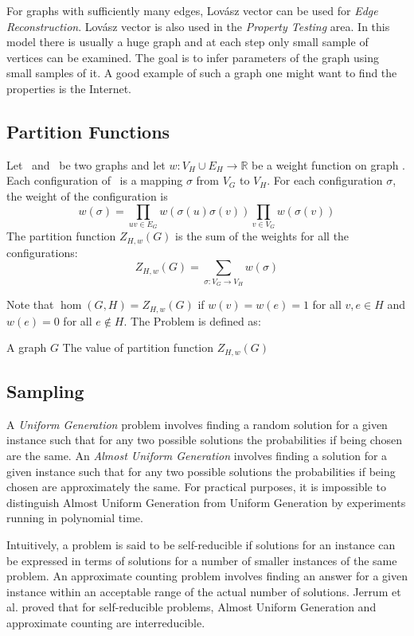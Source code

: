 For graphs with sufficiently many edges,
Lov\'{a}sz vector can be used for \emph{Edge Reconstruction}.
Lov\'{a}sz vector is also used in the {\em Property Testing} area.
In this model there is usually a huge graph and at each step only small sample of vertices
can be examined. The goal is to infer parameters of the graph using small samples of it. 
A good example of such a graph one might want to find the properties is the Internet.

\subsection*{Partition Functions}
Let \mG\ and \mH\ be two graphs and let \(w: V_H \cup E_H\to \mathbb{R}\) be a weight function
on graph \mH. Each configuration of \mG\ is a mapping \(\sigma\) from \(V_G\) to
\(V_H\). For each configuration \(\sigma\), the weight of the configuration is
\[w(\sigma)=\prod_{uv\in E_G}w(\sigma(u)\sigma(v))\prod_{v\in V_G}w(\sigma(v))\]
The partition function \(Z_{H,w}(G)\) is the sum of the weights for all the configurations:
\[Z_{H,w}(G)=\sum_{\sigma:V_G\to V_H}w(\sigma)\]

Note that \(\hom(G,H)=Z_{H,w}(G)\) if \(w(v)=w(e)=1\) for all \(v,e\in H\)
and \(w(e)=0\) for all \(e\not\in H\)\@. 
The  Problem is defined as:

\pnndef%
{A graph \(G\)}
{The value of partition function \(Z_{H,w}(G)\)}

\subsection*{Sampling}
A \emph{Uniform Generation} problem involves finding a
random solution for a given instance such that for any two possible solutions
the probabilities if being chosen are the same.
An \emph{Almost Uniform Generation} involves finding 
a solution for a given instance such that
for any two possible solutions the probabilities if being chosen are approximately the same.
For practical purposes, it is impossible to distinguish
Almost Uniform Generation from Uniform Generation by experiments running in polynomial time.

Intuitively, a problem is said to be self-reducible if solutions for an instance can be
expressed in terms of solutions for a number of smaller instances of the same problem.
An approximate counting problem involves finding an answer for a given
instance within an acceptable range of the actual number of solutions.
Jerrum et al. \cite{JVV} proved that 
for self-reducible problems, Almost Uniform Generation and approximate counting 
are interreducible.

